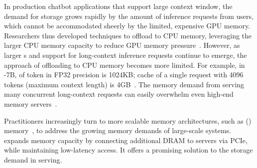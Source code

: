 In production chatbot applications that support large context window, the demand for \kvcache storage grows rapidly by the amount of inference requests from users, which cannot be accommodated sheerly by the limited, expensive GPU memory.
Researchers thus developed techniques to offload \kvcache to CPU memory, leveraging the larger CPU memory capacity to reduce GPU memory pressure~\cite{pagedattenion, memserve, cacheblend}. 
However, as larger \llm{}s and support for long-context inference requests continue to emerge, the approach of offloading to CPU memory becomes more limited.
For example, in -7B, \kvcache of token in FP32 precision is 1024KB; \kv cache of a single request with 4096 tokens (maximum context length) is 4GB~\cite{llama2}.
The memory demand from serving many concurrent long-context requests can easily overwhelm even high-end memory servers~\cite{pagedattenion, kvcost}. 

Practitioners increasingly turn to more scalable memory architectures, such as \cxlfull (\cxl) memory~\cite{cxl1, cxl2, pond}, to address the growing memory demands of large-scale systems. 
\cxl{} expands memory capacity by connecting additional DRAM to servers via PCIe, while maintaining low-latency access. It offers a promising solution to the \kvcache storage demand in \llm serving.

